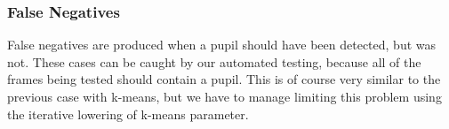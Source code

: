 \subsubsection{False Negatives}
False negatives are produced when a pupil should have been detected, but was not. These cases can be caught by our automated testing, because all of the frames being tested should contain a pupil. This is of course very similar to the previous case with k-means, but we have to manage limiting this problem using the iterative lowering of k-means parameter.
